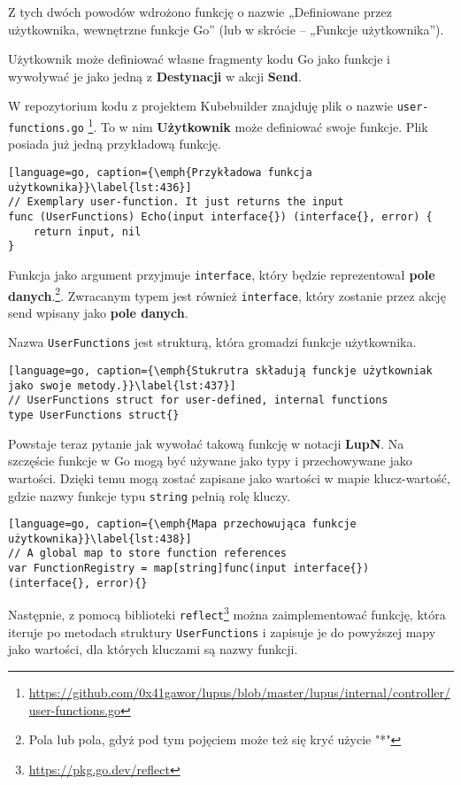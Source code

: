 Z tych dwóch powodów wdrożono funkcję o nazwie „Definiowane przez użytkownika, wewnętrzne funkcje Go” (lub w skrócie – „Funkcje użytkownika”).

Użytkownik może definiować własne fragmenty kodu Go jako funkcje i wywoływać je jako jedną z \textbf{Destynacji} w akcji \textbf{Send}.

W repozytorium kodu z projektem Kubebuilder znajduję plik o nazwie \texttt{user-functions.go} \footnote{\url{https://github.com/0x41gawor/lupus/blob/master/lupus/internal/controller/user-functions.go}}. To w nim \textbf{Użytkownik} może definiować swoje funkcje. Plik posiada już jedną przykładową funkcję.

\begin{lstlisting}[language=go, caption={\emph{Przykładowa funkcja użytkownika}}\label{lst:436}]
// Exemplary user-function. It just returns the input
func (UserFunctions) Echo(input interface{}) (interface{}, error) {
	return input, nil
}
\end{lstlisting}

Funkcja jako argument przyjmuje \texttt{interface{}}, który będzie reprezentował \textbf{pole danych}.\footnote{Pola lub pola, gdyż pod tym pojęciem może też się kryć użycie "*"}. Zwracanym typem jest również \texttt{interface{}}, który zostanie przez akcję send wpisany jako \textbf{pole danych}.

Nazwa \texttt{UserFunctions} jest strukturą, która gromadzi funkcje użytkownika.

\begin{lstlisting}[language=go, caption={\emph{Stukrutra składują funckje użytkowniak jako swoje metody.}}\label{lst:437}]
// UserFunctions struct for user-defined, internal functions
type UserFunctions struct{}
\end{lstlisting}

Powstaje teraz pytanie jak wywołać takową funkcję w notacji \textbf{LupN}. Na szczęście funkcje w Go mogą być używane jako typy i przechowywane jako wartości. Dzięki temu mogą zostać zapisane jako wartości w mapie klucz-wartość, gdzie nazwy funkcje typu \texttt{string} pełnią rolę kluczy.


\begin{lstlisting}[language=go, caption={\emph{Mapa przechowująca funkcje użytkownika}}\label{lst:438}]
// A global map to store function references
var FunctionRegistry = map[string]func(input interface{}) (interface{}, error){}
\end{lstlisting}

Następnie, z pomocą biblioteki \texttt{reflect}\footnote{\url{https://pkg.go.dev/reflect}} można zaimplementować funkcję, która iteruje po metodach struktury \texttt{UserFunctions} i zapisuje je do powyższej mapy jako wartości, dla których kluczami są nazwy funkcji. 

